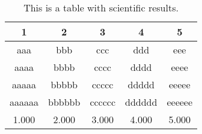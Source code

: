 \documentclass{nature}
\begin{document}

\begin{table}
\centering
\caption{This is a table with scientific results.}
\medskip
\begin{tabular}{ccccc}
\hline
1 & 2 & 3 & 4 & 5\\
\hline
aaa & bbb & ccc & ddd & eee\\
aaaa & bbbb & cccc & dddd & eeee\\
aaaaa & bbbbb & ccccc & ddddd & eeeee\\
aaaaaa & bbbbbb & cccccc & dddddd & eeeeee\\
1.000 & 2.000 & 3.000 & 4.000 & 5.000\\
\hline
\end{tabular}
\end{table}
\end{document}
